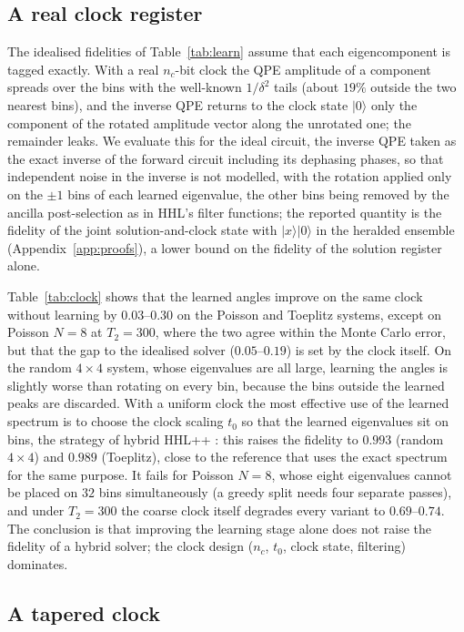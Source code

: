 \documentclass[journal]{IEEEtran}
\begin{document}
\subsection{A real clock register}

The idealised fidelities of Table~\ref{tab:learn} assume that each eigencomponent is tagged exactly. With a real $n_c$-bit clock the QPE amplitude of a component spreads over the bins with the well-known $1/\delta^2$ tails (about $19\%$ outside the two nearest bins), and the inverse QPE returns to the clock state $|0\rangle$ only the component of the rotated amplitude vector along the unrotated one; the remainder leaks. We evaluate this for the ideal circuit, the inverse QPE taken as the exact inverse of the forward circuit including its dephasing phases, so that independent noise in the inverse is not modelled, with the rotation applied only on the $\pm1$ bins of each learned eigenvalue, the other bins being removed by the ancilla post-selection as in HHL's filter functions; the reported quantity is the fidelity of the joint solution-and-clock state with $|x\rangle|0\rangle$ in the heralded ensemble (Appendix~\ref{app:proofs}), a lower bound on the fidelity of the solution register alone.

Table~\ref{tab:clock} shows that the learned angles improve on the same clock without learning by $0.03$--$0.30$ on the Poisson and Toeplitz systems, except on Poisson $N=8$ at $T_2=300$, where the two agree within the Monte Carlo error, but that the gap to the idealised solver ($0.05$--$0.19$) is set by the clock itself. On the random $4\times4$ system, whose eigenvalues are all large, learning the angles is slightly worse than rotating on every bin, because the bins outside the learned peaks are discarded. With a uniform clock the most effective use of the learned spectrum is to choose the clock scaling $t_0$ so that the learned eigenvalues sit on bins, the strategy of hybrid HHL++ \cite{Yalovetzky2024}: this raises the fidelity to $0.993$ (random $4\times4$) and $0.989$ (Toeplitz), close to the reference that uses the exact spectrum for the same purpose. It fails for Poisson $N=8$, whose eight eigenvalues cannot be placed on $32$ bins simultaneously (a greedy split needs four separate passes), and under $T_2=300$ the coarse clock itself degrades every variant to $0.69$--$0.74$. The conclusion is that improving the learning stage alone does not raise the fidelity of a hybrid solver; the clock design ($n_c$, $t_0$, clock state, filtering) dominates.

\subsection{A tapered clock}
\end{document}
